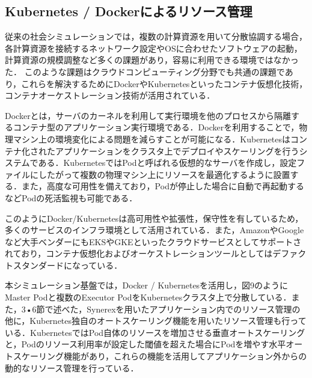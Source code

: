 \documentclass[originalpaper]{jsaiart}     %
\begin{document}
\subsection{Kubernetes / Dockerによるリソース管理}
従来の社会シミュレーションでは，複数の計算資源を用いて分散協調する場合，各計算資源を接続するネットワーク設定やOSに合わせたソフトウェアの起動，計算資源の規模調整など多くの課題があり，容易に利用できる環境ではなかった．
このような課題はクラウドコンピューティング分野でも共通の課題であり，これらを解決するためにDockerやKubernetesといったコンテナ仮想化技術，コンテナオーケストレーション技術が活用されている．

Dockerとは，サーバのカーネルを利用して実行環境を他のプロセスから隔離するコンテナ型のアプリケーション実行環境である．Dockerを利用することで，物理マシン上の環境変化による問題を減らすことが可能になる．Kubernetesはコンテナ化されたアプリケーションをクラスタ上でデプロイやスケーリングを行うシステムである．KubernetesではPodと呼ばれる仮想的なサーバを作成し，設定ファイルにしたがって複数の物理マシン上にリソースを最適化するように設置する．また，高度な可用性を備えており，Podが停止した場合に自動で再起動するなどPodの死活監視も可能である．

このようにDocker/Kubernetesは高可用性や拡張性，保守性を有しているため，多くのサービスのインフラ環境として活用されている．また，AmazonやGoogleなど大手ベンダーにもEKSやGKEといったクラウドサービスとしてサポートされており，コンテナ仮想化およびオーケストレーションツールとしてはデファクトスタンダードになっている．

本シミュレーション基盤では，Docker / Kubernetesを活用し，図9のようにMaster Podと複数のExecutor PodをKubernetesクラスタ上で分散している．また，3•6節で述べた，Synerexを用いたアプリケーション内でのリソース管理の他に，Kubernetes独自のオートスケーリング機能を用いたリソース管理も行っている．KubernetesではPod自体のリソースを増加させる垂直オートスケーリングと，Podのリソース利用率が設定した閾値を超えた場合にPodを増やす水平オートスケーリング機能があり，これらの機能を活用してアプリケーション外からの動的なリソース管理を行っている．
\end{document}

